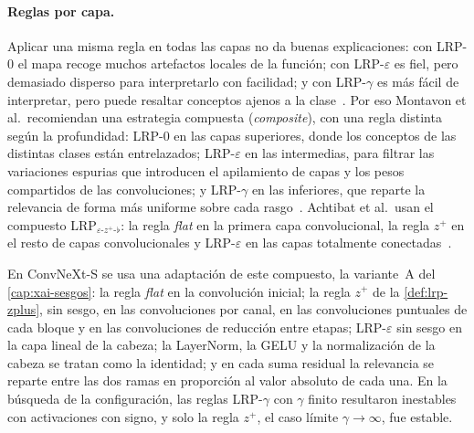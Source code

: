 \paragraph{Reglas por capa.} Aplicar una misma regla en todas las capas no da
buenas explicaciones: con LRP-0 el mapa recoge muchos artefactos locales de la
función; con LRP-$\varepsilon$ es fiel, pero demasiado disperso para interpretarlo
con facilidad; y con LRP-$\gamma$ es más fácil de interpretar, pero puede resaltar
conceptos ajenos a la clase~\cite[sec.~10.3]{montavon2019lrp}. Por eso Montavon
et al.\ recomiendan una estrategia compuesta (\emph{composite}), con una regla
distinta según la profundidad: LRP-0 en las capas superiores, donde los conceptos
de las distintas clases están entrelazados; LRP-$\varepsilon$ en las intermedias,
para filtrar las variaciones espurias que introducen el apilamiento de capas y los
pesos compartidos de las convoluciones; y LRP-$\gamma$ en las inferiores, que
reparte la relevancia de forma más uniforme sobre cada
rasgo~\cite[sec.~10.3]{montavon2019lrp}. Achtibat et al.\ usan el compuesto
LRP$_{\varepsilon\text{-}z^{+}\text{-}\flat}$: la regla \emph{flat} en la primera
capa convolucional, la regla $z^{+}$ en el resto de capas convolucionales y
LRP-$\varepsilon$ en las capas totalmente conectadas~\cite{achtibat2023}.

En ConvNeXt-S se usa una adaptación de este compuesto, la variante~A del
\cref{cap:xai-sesgos}: la regla \emph{flat} en la convolución inicial; la regla
$z^{+}$ de la \cref{def:lrp-zplus}, sin sesgo, en las convoluciones por canal, en
las convoluciones puntuales de cada bloque y en las convoluciones de reducción entre
etapas; LRP-$\varepsilon$ sin sesgo en la capa lineal de la cabeza; la LayerNorm, la
GELU y la normalización de la cabeza se tratan como la identidad; y en cada suma
residual la relevancia se reparte entre las dos ramas en proporción al valor
absoluto de cada una. En la búsqueda de la configuración, las reglas LRP-$\gamma$
con $\gamma$ finito resultaron inestables con activaciones con signo, y solo la
regla $z^{+}$, el caso límite $\gamma \to \infty$, fue estable.

